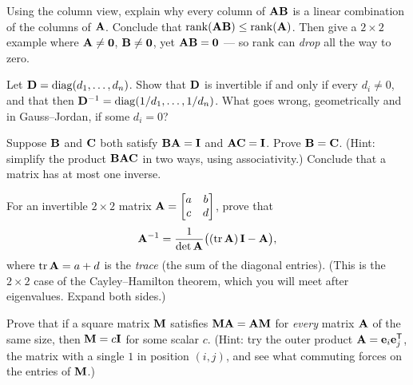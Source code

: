 \begin{exercise}
Using the column view, explain why every column of $\mathbf{A}\mathbf{B}$ is a linear
combination of the columns of $\mathbf{A}$. Conclude that $\operatorname{rank}(\mathbf{A}\mathbf{B}) \le
\operatorname{rank}(\mathbf{A})$. Then give a $2\times2$ example where $\mathbf{A}\ne\mathbf{0}$, $\mathbf{B}\ne
\mathbf{0}$, yet $\mathbf{A}\mathbf{B} = \mathbf{0}$ --- so rank can \emph{drop} all the way to zero.
\end{exercise}

\begin{exercise}
Let $\mathbf{D} = \operatorname{diag}(d_1,\dots,d_n)$. Show that $\mathbf{D}$ is invertible if and only if
every $d_i \ne 0$, and that then $\mathbf{D}^{-1} = \operatorname{diag}(1/d_1,\dots,1/d_n)$. What goes
wrong, geometrically and in Gauss--Jordan, if some $d_i = 0$?
\end{exercise}

\begin{exercise}
Suppose $\mathbf{B}$ and $\mathbf{C}$ both satisfy $\mathbf{B}\mathbf{A} = \mathbf{I}$ and
$\mathbf{A}\mathbf{C} = \mathbf{I}$. Prove $\mathbf{B} = \mathbf{C}$. (Hint: simplify the product
$\mathbf{B}\mathbf{A}\mathbf{C}$ in two ways, using associativity.) Conclude that a matrix has at
most one inverse.
\end{exercise}

\begin{exercise}
For an invertible $2\times2$ matrix $\mathbf{A} = \begin{bmatrix} a & b \\ c & d \end{bmatrix}$, prove that
\[
\mathbf{A}^{-1} = \frac{1}{\det\mathbf{A}}\bigl((\operatorname{tr}\mathbf{A})\,\mathbf{I} - \mathbf{A}\bigr),
\]
where $\operatorname{tr}\mathbf{A} = a + d$ is the \emph{trace} (the sum of the diagonal entries). (This
is the $2\times2$ case of the Cayley--Hamilton theorem, which you will meet after
eigenvalues. Expand both sides.)
\end{exercise}

\begin{exercise}
Prove that if a square matrix $\mathbf{M}$ satisfies $\mathbf{M}\mathbf{A} = \mathbf{A}\mathbf{M}$ for
\emph{every} matrix $\mathbf{A}$ of the same size, then $\mathbf{M} = c\mathbf{I}$ for some scalar
$c$. (Hint: try the outer product $\mathbf{A} = \mathbf{e}_i\mathbf{e}_j^{\mathsf{T}}$, the matrix with a single $1$ in
position $(i,j)$, and see what commuting forces on the entries of $\mathbf{M}$.)
\end{exercise}

